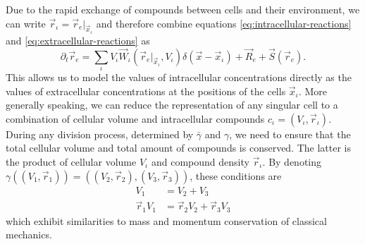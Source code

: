 Due to the rapid exchange of compounds between cells and their environment, we can write
$\vec{r}_\iota=\vec{r}_e|_{\vec{x}_\iota}$ and therefore combine equations
\eqref{eq:intracellular-reactions} and \eqref{eq:extracellular-reactions} as
\begin{equation}
    \partial_t\vec{r}_e
        =\sum\limits_\iota V_\iota \vec{W}_\iota(\vec{r}_e|_{\vec{x}_\iota},V_\iota)
            \delta(\vec{x}-\vec{x}_\iota)
            +\vec{R}_e + \vec{S}(\vec{r}_e).
\end{equation}
This allows us to model the values of intracellular concentrations directly as the values of
extracellular concentrations at the positions of the cells $\vec{x}_\iota$.
More generally speaking, we can reduce the representation of any singular cell to a
combination of cellular volume and intracellular compounds $c_\iota=(V_\iota,\vec{r}_\iota)$.
During any division process, determined by $\bar{\gamma}$ and $\gamma$, we need to ensure that the
total cellular volume and total amount of compounds is conserved.
The latter is the product of cellular volume $V_\iota$ and compound density $\vec{r}_\iota$.
By denoting $\gamma((V_1,\vec{r}_1))=((V_2,\vec{r}_2),(V_3,\vec{r}_3))$, these conditions are
\begin{align}
    V_1 &= V_2 + V_3
    \label{eq:case1-volume-conservation}\\
    \vec{r}_1V_1 &= \vec{r}_2V_2 + \vec{r}_3V_3
    \label{eq:case1-compound-conservation}
\end{align}
which exhibit similarities to mass and momentum conservation of classical mechanics.

